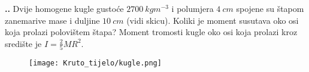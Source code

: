 
\noindent 
\textbf{
\thecjelina.\thezadatak.}
Dvije homogene kugle gustoće $2700\ kgm^{-3}$ i polumjera $4\ cm$ spojene su štapom zanemarive mase i duljine $10\ cm$ (vidi skicu).
Koliki je moment susutava oko osi koja prolazi polovištem štapa? Moment tromosti kugle oko osi koja prolazi kroz središte je $I=\frac{2}{5}MR^2$.
\begin{figure}[h]%
  \begin{center}
    \texttt{[image: Kruto\_tijelo/kugle.png]}
  \end{center}
\end{figure}


